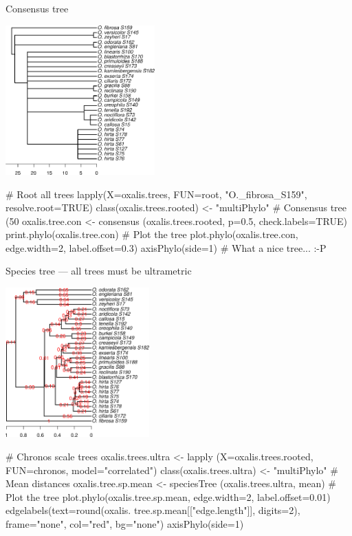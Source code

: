 \documentclass[compress, ucs, xelatex, 11pt, xcolor=svgnames,
  hyperref={
    bookmarks=true,
    unicode=true,
    colorlinks=true,
    pdftitle={Molecular data in R},
    plainpages=false,
    pdfauthor={Vojtech Zeisek},
    pdfsubject={Course about phylogeny and evolution in R},
    pdfcreator={XeLaTeX},
    pdfkeywords={R, evolution, phylogeny, molecular data},
    linkcolor=Tomato,
    anchorcolor=SaddleBrown,
    citecolor=Goldenrod,
    filecolor=DarkMagenta,
    menucolor=Sienna,
    urlcolor=DarkTurquoise,
    pdftex},
  url={hyphens, lowtilde} %
  ]{beamer}
\begin{document}
\begin{frame}[fragile]{Consensus tree}
\begin{multicols}{2}
  \begin{center}
    \includegraphics[height=5.75cm]{oxalis-cons.png}
  \end{center}
  \begin{spluscode}
    # Root all trees
    lapply(X=oxalis.trees, FUN=root,
      "O._fibrosa_S159",
      resolve.root=TRUE)
    class(oxalis.trees.rooted) <-
      "multiPhylo"
    # Consensus tree (50 %
    oxalis.tree.con <- consensus
      (oxalis.trees.rooted, p=0.5,
      check.labels=TRUE)
    print.phylo(oxalis.tree.con)
    # Plot the tree
    plot.phylo(oxalis.tree.con,
      edge.width=2, label.offset=0.3)
    axisPhylo(side=1)
    # What a nice tree... :-P
  \end{spluscode}
\end{multicols}
\end{frame}

\begin{frame}[fragile]{Species tree --- all trees must be ultrametric}
\begin{multicols}{2}
  \begin{center}
    \includegraphics[height=5.75cm]{oxalis-sp.png}
  \end{center}
  \begin{spluscode}
    # Chronos scale trees
    oxalis.trees.ultra <- lapply
      (X=oxalis.trees.rooted,
      FUN=chronos, model="correlated")
    class(oxalis.trees.ultra) <-
      "multiPhylo"
    # Mean distances
    oxalis.tree.sp.mean <- speciesTree
      (oxalis.trees.ultra, mean)
    # Plot the tree
    plot.phylo(oxalis.tree.sp.mean,
      edge.width=2, label.offset=0.01)
    edgelabels(text=round(oxalis.
      tree.sp.mean[["edge.length"]],
      digits=2), frame="none",
      col="red", bg="none")
    axisPhylo(side=1)
  \end{spluscode}
\end{multicols}
\end{frame}
\end{document}
